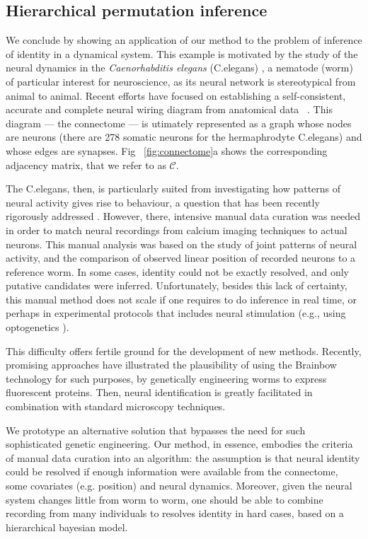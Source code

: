 \documentclass[twoside]{article}
\begin{document}
\subsection{Hierarchical permutation inference}

\label{sec:synth_celegans}


We conclude by showing an application of our method to the problem of inference of identity in a dynamical system. This example is motivated by the study of the neural dynamics in the \textit{Caenorhabditis elegans} (C.elegans)  \cite{Kato2015}, a nematode (worm) of particular interest for neuroscience, as its neural network is stereotypical from animal to animal. Recent efforts have focused on establishing a self-consistent, accurate and complete neural wiring diagram from anatomical data ~\citep{varshney2011structural}. This diagram --- the connectome --- is utimately represented as a graph whose nodes are neurons (there are 278 somatic neurons for the hermaphrodyte C.elegans) and whose edges are synapses. Fig ~\ref{fig:connectome}a shows the corresponding adjacency matrix, that we refer to as $\mathcal{C}$.

The C.elegans, then, is particularly suited from investigating how patterns of neural activity gives rise to behaviour, a question that has been recently rigorously addressed \cite{Kato2015}. However, there, intensive manual data curation was needed in order to match neural recordings from calcium imaging techniques to actual neurons. This manual analysis was based on the study of joint patterns of neural activity, and the comparison of observed linear position of recorded neurons to a reference worm. In some cases, identity could not be exactly resolved, and only putative candidates were inferred. Unfortunately, besides this lack of certainty, this manual method does not scale if one requires to do inference in real time, or perhaps in experimental protocols that includes neural stimulation (e.g., using optogenetics \cite{Grosenick2015}). 

This difficulty offers fertile ground for the development of new methods. Recently, promising approaches \cite{Aoki2017} have illustrated the plausibility of using the Brainbow technology \cite{Livet2007} for such purposes, by genetically engineering worms to express fluorescent proteins. Then, neural identification is greatly facilitated in combination with standard microscopy techniques.

We prototype an alternative solution that bypasses the need for such sophisticated genetic engineering. Our method, in essence, embodies the criteria of manual data curation into an algorithm: the assumption is that neural identity could be resolved if enough information were available from the connectome, some covariates (e.g. position) and neural dynamics. Moreover, given the neural system changes little from worm to worm, one should be able to combine recording from many individuals to resolves identity in hard cases, based on a hierarchical bayesian model.
\end{document}
